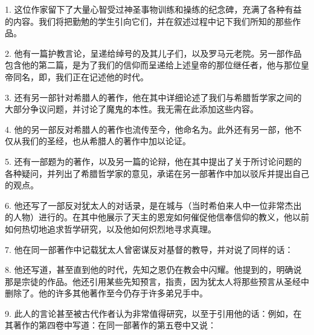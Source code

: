 1. 这位作家留下了大量心智受过神圣事物训练和操练的纪念碑，充满了各种有益的内容。我们将把勤勉的学生引向它们，并在叙述过程中记下我们所知的那些作品。\par

2. 他有一篇护教言论，呈递给绰号的及其儿子们，以及罗马元老院。另一部作品包含他的第二篇，是为了我们的信仰而呈递给上述皇帝的那位继任者，他与那位皇帝同名，即，我们正在记述他的时代。\par

3. 还有另一部针对希腊人的著作，他在其中详细论述了我们与希腊哲学家之间的大部分争议问题，并讨论了魔鬼的本性。我无需在此添加这些内容。\par

4. 他的另一部反对希腊人的著作也流传至今，他命名为。此外还有另一部，他不仅从我们的圣经，也从希腊人的著作中加以论证。\par

5. 还有一部题为的著作，以及另一篇的论辩，他在其中提出了关于所讨论问题的各种疑问，并列出了希腊哲学家的意见，承诺在另一部著作中加以驳斥并提出自己的观点。\par

6. 他还写了一部反对犹太人的对话录，是在城与（当时希伯来人中一位非常杰出的人物）进行的。在其中他展示了天主的恩宠如何催促他信奉信仰的教义，他以前如何热切地追求哲学研究，以及他如何炽烈地寻求真理。\par

7. 他在同一部著作中记载犹太人曾密谋反对基督的教导，并对说了同样的话：\par

8. 他还写道，甚至直到他的时代，先知之恩仍在教会中闪耀。他提到的，明确说那是宗徒的作品。他还引用某些先知预言，指责，因为犹太人将那些预言从圣经中删除了。他的许多其他著作至今仍存于许多弟兄手中。\par

9. 此人的言论甚至被古代作者认为非常值得研究，以至于引用他的话：例如，在其著作的第四卷中写道：在同一部著作的第五卷中又说：\par

